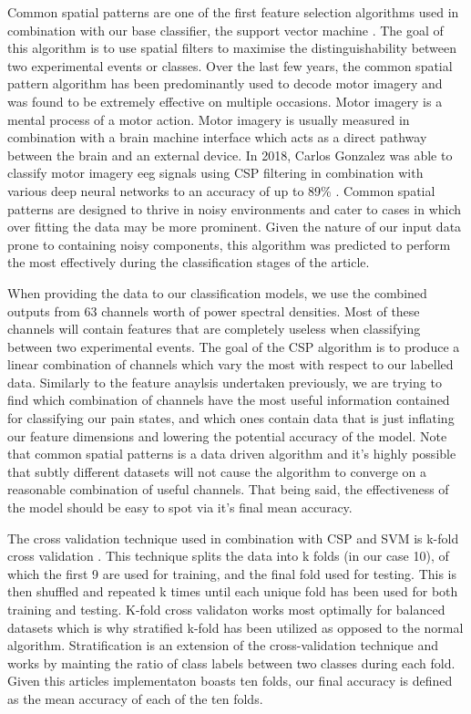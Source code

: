 \documentclass[11pt]{article}
\begin{document}
Common spatial patterns are one of the first feature selection algorithms used in combination with our base classifier, the support vector machine \cite{4634130}. The goal of this algorithm is to use spatial filters to maximise the distinguishability between two experimental events or classes. Over the last few years, the common spatial pattern algorithm has been predominantly used to decode motor imagery and was found to be extremely effective on multiple occasions. Motor imagery is a mental process of a motor action. Motor imagery is usually measured in combination with a brain machine interface which acts as a direct pathway between the brain and an external device. In 2018, Carlos Gonzalez was able to classify motor imagery eeg signals using CSP filtering in combination with various deep neural networks to an accuracy of up to 89\% \cite{CSP}. Common spatial patterns are designed to thrive in noisy environments and cater to cases in which over fitting the data may be more prominent. Given the nature of our input data prone to containing noisy components, this algorithm was predicted to perform the most effectively during the classification stages of the article.

When providing the data to our classification models, we use the combined outputs from 63 channels worth of power spectral densities. Most of these channels will contain features that are completely useless when classifying between two experimental events. The goal of the CSP algorithm is to produce a linear combination of channels which vary the most with respect to our labelled data. Similarly to the feature anaylsis undertaken previously, we are trying to find which combination of channels have the most useful information contained for classifying our pain states, and which ones contain data that is just inflating our feature dimensions and lowering the potential accuracy of the model. Note that common spatial patterns is a data driven algorithm and it's highly possible that subtly different datasets will not cause the algorithm to converge on a reasonable combination of useful channels. That being said, the effectiveness of the model should be easy to spot via it's final mean accuracy. 

The cross validation technique used in combination with CSP and SVM is k-fold cross validation \cite{CV}. This technique splits the data into k folds (in our case 10), of which the first 9 are used for training, and the final fold used for testing. This is then shuffled and repeated k times until each unique fold has been used for both training and testing. K-fold cross validaton works most optimally for balanced datasets which is why stratified k-fold has been utilized as opposed to the normal algorithm. Stratification is an extension of the cross-validation technique and works by mainting the ratio of class labels between two classes during each fold. Given this articles implementaton boasts ten folds, our final accuracy is defined as the mean accuracy of each of the ten folds. 
\end{document}
